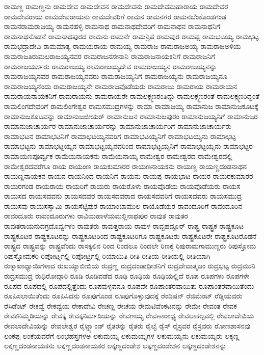 {ರಾಮಣ್ಣ
ರಾಮಣ್ಣನು
ರಾಮದೇವ
ರಾಮದೇವನ
ರಾಮದೇವನು
ರಾಮದೇವಮಹಾರಾಯ
ರಾಮದೇವರ
ರಾಮದೇವರಾಯ
ರಾಮದೇವರಾಯನು
ರಾಮದೇವರಿಗೆ
ರಾಮನ
ರಾಮನಗರ
ರಾಮನಬೆಂಕೊಂಡಗಂಡ
ರಾಮನರಾಮರಾಜಯ್ಯ
ರಾಮನಹಳ್ಳಿ
ರಾಮನಾಥ
ರಾಮನಾಥದೇವರಿಗೆ
ರಾಮನಾಥನ
ರಾಮನಾಥನಿಗೆ
ರಾಮನಾಥನೊಡನೆ
ರಾಮನಾಥಪುರದ
ರಾಮನು
ರಾಮನೇ
ರಾಮನ್ರಿಪ
ರಾಮಪುರ
ರಾಮಪ್ಪ
ರಾಮಭಟಯ್ಯ
ರಾಮಭಟ್ಟ
ರಾಮಭದ್ರಾದೇವಿ
ರಾಮಮಾತ್ಯ
ರಾಮಯರಾಯ
ರಾಮಯ್ಯ
ರಾಮರಾಜ
ರಾಮರಾಜಅಯ್ಯ
ರಾಮರಾಜಅಳಿಯ
ರಾಮರಾಜತಿರುಮಲರಾಜಯ್ಯನವರ
ರಾಮರಾಜನಸೇನಾನಿ
ರಾಮರಾಜನಾಯಕನಿಗೆ
ರಾಮರಾಜನಿಗೆ
ರಾಮರಾಜಯರ್ಸರು
ರಾಮರಾಜಯ್ಯ
ರಾಮರಾಜಯ್ಯದೇವ
ರಾಮರಾಜಯ್ಯನ
ರಾಮರಾಜಯ್ಯನನ್ನು
ರಾಮರಾಜಯ್ಯನವರ
ರಾಮರಾಜಯ್ಯನವರು
ರಾಮರಾಜಯ್ಯನಿಗೆ
ರಾಮರಾಜಯ್ಯನು
ರಾಮರಾಜಯ್ಯನೂ
ರಾಮರಾಜಯ್ಯನೆಂದು
ರಾಮರಾಜಯ್ಯನೇ
ರಾಮರಾಜವೊಡೆಯರು
ರಾಮರಾಜು
ರಾಮರಾಯ
ರಾಮರಾಯನ
ರಾಮರಾಯನಾಯಕನಿಗೆ
ರಾಮರಾಯನು
ರಾಮರಾಯರೇ
ರಾಮಲಕ್ಷ್ಮಣರಂತಿದ್ದು
ರಾಮಲಕ್ಷ್ಮಣರಂತೆ
ರಾಮಲಕ್ಷ್ಮಣರಿದ್ದಂತೆ
ರಾಮಲಿಂಗದೇವರಿಗೆ
ರಾಮಲಿಂಗೇಶ್ವರ
ರಾಮಸಮುದ್ರಗಳನ್ನು
ರಾಮಾ
ರಾಮಾಜಯ್ಯ
ರಾಮಾನುಜ
ರಾಮಾನುಜಕೂಟಕ್ಕೆ
ರಾಮಾನುಜಕೂಟವನ್ನು
ರಾಮಾನುಜಜೀಯರ್
ರಾಮಾನುಜನ
ರಾಮಾನುಜಪುರಂ
ರಾಮಾನುಜಯ್ಯನಿಗೆ
ರಾಮಾನುಜರ
ರಾಮಾನುಜಾಚಾರ್ಯರ
ರಾಮಾನುಜಾಚಾರ್ಯರನ್ನು
ರಾಮಾನುಜಾಚಾರ್ಯರಿಗೆ
ರಾಮಾನುಜಾಚಾರ್ಯರು
ರಾಮಾಭಟನ
ರಾಮಾಭಟನಿಗೆ
ರಾಮಾಭಟಯ್ಯನವರಿಗೆ
ರಾಮಾಭಟಯ್ಯನಿಗೆ
ರಾಮಾಭಟಯ್ಯನು
ರಾಮಾಭಟ್ಟ
ರಾಮಾಭಟ್ಟನು
ರಾಮಾಭಟ್ಟಯ್ಯನ
ರಾಮಾಭಟ್ಟಯ್ಯನವರಿಂದ
ರಾಮಾಭಟ್ಟಯ್ಯನಿಗೆ
ರಾಮಾಭಟ್ಟಯ್ಯನು
ರಾಮಾಭಟ್ಟರ
ರಾಮಾಯಣಪೂರ್ವ್ವಕ
ರಾಮೆಯನಾಯಕನು
ರಾಮೆಯನಾಯ್ಕ
ರಾಮೇಶ್ವರ
ರಾಮೇಶ್ವರದ
ರಾಮೇಶ್ವರದಲ್ಲಿ
ರಾಮೇಶ್ವರದವರೆಗೂ
ರಾಯ
ರಾಯಂಣ
ರಾಯಕುಮಾರರ
ರಾಯಣನಾಯಕನು
ರಾಯಣ್ಣ
ರಾಯಣ್ಣದಂಡನಾಥನ
ರಾಯಣ್ಣನಾಯಕನ
ರಾಯನ
ರಾಯನಿಂದ
ರಾಯನಿಗೆ
ರಾಯನು
ರಾಯಪ್ಪ
ರಾಯಭಾಟ
ರಾಯರ
ರಾಯರಕುಮಾರರ
ರಾಯರಗಂಡ
ರಾಯರಾಯ
ರಾಯರಿಗೆ
ರಾಯರು
ರಾಯರೊಳು
ರಾಯವೊಡೆಯ
ರಾಯವೊಡೆಯರು
ರಾಯಸ
ರಾಯಸದ
ರಾಯಸದವನು
ರಾಯಸದವರ
ರಾಯಸದವರಾದ
ರಾಯಸದವರಿಗೆ
ರಾಯಸದವರು
ರಾಯಸಮುದ್ರ
ರಾಯಸವು
ರಾಯಸಸ್ವಾಮಿ
ರಾಯಸೆಟ್ಟಿಪುರ
ರಾಯಾಂಬಾಮುಲ
ರಾಯೊಡೆಯರ
ರಾವಂದೂರಿಗೆ
ರಾವಂದೂರಿನ
ರಾವಂದೂರು
ರಾವಂದೂರುಗಳು
ರಾವಿಯಹಾಳೆಯಮಲ್ಲಿನಾಥಪುರ
ರಾವುತ
ರಾವುತರ
ರಾವುತರಾಯನುದಗ್ರದೊರ್ವ್ವಳಂ
ರಾವುತರು
ರಾವುತ್ತರಾಯ
ರಾವುಳ
ರಾವ್ಬಹದ್ದೂರ್
ರಾಷ್ಟ್ರ
ರಾಷ್ಟ್ರಕ
ರಾಷ್ಟ್ರಕೂಟ
ರಾಷ್ಟ್ರಕೂಟರ
ರಾಷ್ಟ್ರಕೂಟರನ್ನು
ರಾಷ್ಟ್ರಕೂಟರಿಂದ
ರಾಷ್ಟ್ರಕೂಟರಿಗೂ
ರಾಷ್ಟ್ರಕೂಟರು
ರಾಷ್ಟ್ರಕೂಟರೇ
ರಾಷ್ಟ್ರಕೂಟರೊಡನೆ
ರಾಷ್ಟ್ರದ
ರಾಷ್ಟ್ರವನ್ನು
ರಾಷ್ಟ್ರವೆಂದು
ರಾಸಕ್ಕಲಿನ
ರಿಂದ
ರಿಂದಲೂ
ರಿಂದಲೇ
ರಿಣಕ್ಕೆ
ರಿಪುರಾಮಗಾಮುಣ್ಡರು
ರಿಪುಸ್ತೋಮ
ರಿಪುಸ್ತೋಮಕರಿ
ರಿಪೋರ್ಟ್ನಲ್ಲಿ
ರಿಪೋರ್ಟ್ರಲ್ಲಿ
ರಿಯಾಯಿತಿ
ರೀತಿ
ರೀತಿಯ
ರೀತಿಯಲ್ಲಿ
ರೀತಿಯಾಗಿ
ರುಕ್ಶಾಖಾಧ್ಯಾಯಿಗಳಾದ
ರುಖಯ್ಯಾಬೀಬಿಯ
ರುದ್ರಣ್ಣ
ರುದ್ರದಂಡಾಧೀಶನಿಗೆ
ರುದ್ರದೇವಾತ್ಮಜಂ
ರುದ್ರಭಟ್ಟ
ರುದ್ರಮುನಿ
ರುದ್ರಸಮುದ್ರ
ರುಧಿರೋದ್ಗಾರಿ
ರೂಡಿ
ರೂಡಿವಡೆದ
ರೂಢಿ
ರೂಢಿಯ
ರೂಢಿಯಲ್ಲಿದೆ
ರೂಪ
ರೂಪಗಳು
ರೂಪಗಳೇ
ರೂಪದ
ರೂಪದಲ್ಲಿ
ರೂಪದಲ್ಲಿತ್ತೆಂದು
ರೂಪವುಳ್ಳವನೂ
ರೂಪವೇ
ರೂಪಾಂತರವಾಯಿತು
ರೂಪಾಂತರವಾಯಿತೆಂದು
ರೂಪಿಸಲಾಯಿತೆಂದು
ರೂಪಿಸಿದನು
ರೂಪುಗೊಂಡ
ರೂಪುಗೊಳ್ಳುವುದಕ್ಕೆ
ರೆಂಡಿಷನ್
ರೆಜಿಮೆಂಟ್
ರೆಡ್ಡಿಯವರು
ರೆಸಿಡೆಂಟ್
ರೇಕವ್ವೆ
ರೇಕವ್ವೆಯ
ರೇಕಾದೇವಿ
ರೇಚಣ್ಣ
ರೇಚೆಯ
ರೇಮಟಿವೆಂಕಟನನ್ನು
ರೇಮೇ
ರೇವಂತ
ರೇವಕ
ರೇವಕನಿಮ್ಮಡಿಯನ್ನು
ರೇವಕ್ಕ
ರೇವಕ್ಕನಿರ್ಮಡಿಯನ್ನು
ರೇವಣಯ್ಯ
ರೇವಣಾರಾಧ್ಯ
ರೇವಲಾಕಲ್ಪವಲ್ಲಿ
ರೇವಲಾದೇವಿಯ
ರೇವಲಾದೇವಿಯನ್ನು
ರೇವಲೇಶ್ವರ
ರೈಟ್ಹ್ಯಾಂಡ್
ರೈತರನ್ನು
ರೈತರು
ರೈಲ್ವೆ
ರೈಸ್
ರೈಸ್ರವರ
ರೈಸ್ರವರು
ರೋಣಶಾಸನವು
ಲಂಕಪ್ಪ
ಲಂಕೆಯವರೆಗೆ
ಲಂಭಹಸ್ತಗಳಅ
ಲಕುಮಯ್ಯ
ಲಕುಮಯ್ಯಗಳ
ಲಕುಮಯ್ಯನು
ಲಕುಮಯ್ಯರು
ಲಕ್ಕಣ್ಣ
ಲಕ್ಕಣ್ಣದಂಡನಾಯಕನು
ಲಕ್ಕಣ್ಣದಂಡನಾಯಕರ
ಲಕ್ಕಣ್ಣದಂಡೇಶ
ಲಕ್ಕಣ್ಣದಂಡೇಶನ
ಲಕ್ಕಣ್ಣದಂಡೇಶನನ್ನು
}

